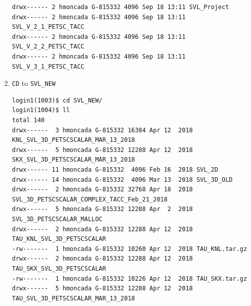 \documentclass{article}
\begin{document}
\begin{enumerate}
\begin{verbatim}
drwx------ 2 hmoncada G-815332 4096 Sep 18 13:11 SVL_Project
drwx------ 2 hmoncada G-815332 4096 Sep 18 13:11 SVL_V_2_1_PETSC_TACC
drwx------ 2 hmoncada G-815332 4096 Sep 18 13:11 SVL_V_2_2_PETSC_TACC
drwx------ 2 hmoncada G-815332 4096 Sep 18 13:11 SVL_V_3_1_PETSC_TACC
\end{verbatim}
\normalsize
\item \verb+CD+ to \verb+SVL_NEW+
\scriptsize
\begin{verbatim}
login1(1003)$ cd SVL_NEW/
login1(1004)$ ll
total 140
drwx------  3 hmoncada G-815332 16384 Apr 12  2018 KNL_SVL_3D_PETSCSCALAR_MAR_13_2018
drwx------  5 hmoncada G-815332 12288 Apr 12  2018 SKX_SVL_3D_PETSCSCALAR_MAR_13_2018
drwx------ 11 hmoncada G-815332  4096 Feb 16  2018 SVL_2D
drwx------ 14 hmoncada G-815332  4096 Mar 13  2018 SVL_3D_OLD
drwx------  2 hmoncada G-815332 32768 Apr 18  2018 SVL_3D_PETSCSCALAR_COMPLEX_TACC_Feb_21_2018
drwx------  5 hmoncada G-815332 12288 Apr  2  2018 SVL_3D_PETSCSCALAR_MALLOC
drwx------  2 hmoncada G-815332 12288 Apr 12  2018 TAU_KNL_SVL_3D_PETSCSCALAR
-rw-------  1 hmoncada G-815332 10260 Apr 12  2018 TAU_KNL.tar.gz
drwx------  2 hmoncada G-815332 12288 Apr 12  2018 TAU_SKX_SVL_3D_PETSCSCALAR
-rw-------  1 hmoncada G-815332 10226 Apr 12  2018 TAU_SKX.tar.gz
drwx------  5 hmoncada G-815332 12288 Apr 12  2018 TAU_SVL_3D_PETSCSCALAR_MAR_13_2018
\end{verbatim}
\normalsize
\end{enumerate}
\end{document}

